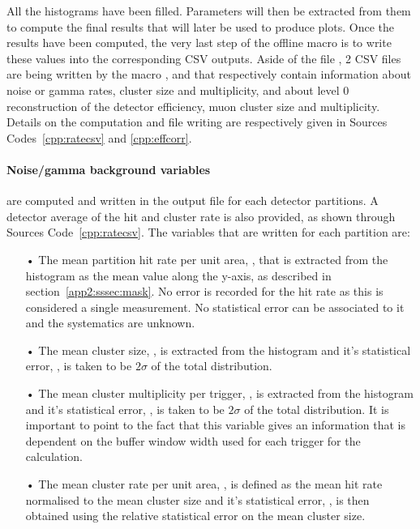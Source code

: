 	All the histograms have been filled. Parameters will then be extracted from them to compute the final results that will later be used to produce plots. Once the results have been computed, the very last step of the offline macro is to write these values into the corresponding CSV outputs. Aside of the file , 2 CSV files are being written by the macro ,  and  that respectively contain information about noise or gamma rates, cluster size and multiplicity, and about level 0 reconstruction of the detector efficiency, muon cluster size and multiplicity. Details on the computation and file writing are respectively given in Sources Codes~\ref{cpp:ratecsv} and \ref{cpp:effcorr}.
	
	\paragraph{Noise/gamma background variables} are computed and written in the output file for each detector partitions. A detector average of the hit and cluster rate is also provided, as shown through Sources Code~\ref{cpp:ratecsv}. The variables that are written for each partition are:
	
	\begin{itemize}
		\item[•] The mean partition hit rate per unit area, , that is extracted from the histogram  as the mean value along the y-axis, as described in section~\ref{app2:sssec:mask}. No error is recorded for the hit rate as this is considered a single measurement. No statistical error can be associated to it and the systematics are unknown.
		\item[•] The mean cluster size, , is extracted from the histogram  and it's statistical error, , is taken to be $2\sigma$ of the total distribution.
		\item[•] The mean cluster multiplicity per trigger, , is extracted from the histogram  and it's statistical error, , is taken to be $2\sigma$ of the total distribution. It is important to point to the fact that this variable gives an information that is dependent on the buffer window width used for each trigger for the calculation.
		\item[•] The mean cluster rate per unit area, , is defined as the mean hit rate normalised to the mean cluster size and it's statistical error, , is then obtained using the relative statistical error on the mean cluster size.
	\end{itemize}
	
